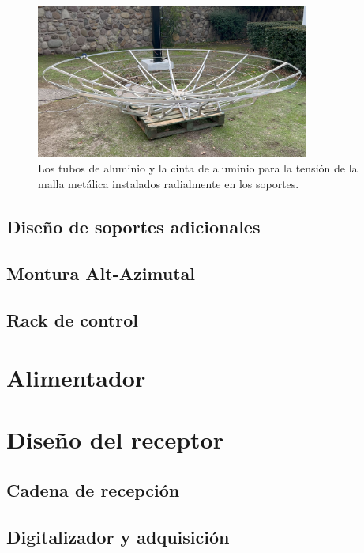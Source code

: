 \begin{figure}
    \centering
    \includegraphics[width=0.8\textwidth]{img/estructura2}
    \caption{Los tubos de aluminio y la cinta de aluminio para la tensión de la malla metálica instalados radialmente en los soportes.}
    \label{fig:ensamble3}
\end{figure}

\subsection{Diseño de soportes adicionales}

\subsection{Montura Alt-Azimutal}

\subsection{Rack de control}

\section{Alimentador}

\section{Diseño del receptor}

\subsection{Cadena de recepción}

\subsection{Digitalizador y adquisición}

